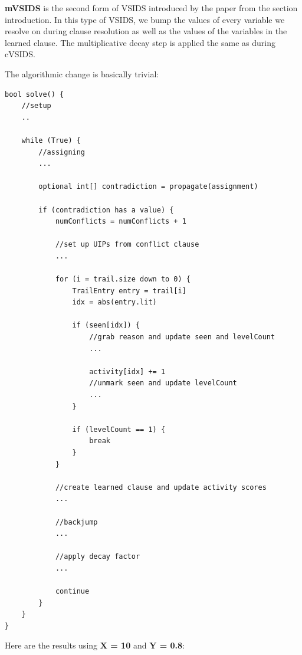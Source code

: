 \documentclass[../main.tex]{subfiles}
\begin{document}
\textbf{mVSIDS} is the second form of VSIDS introduced by the paper from 
the section introduction. In this type of VSIDS, we bump the values of 
every variable we resolve on during clause resolution as well as the values 
of the variables in the learned clause. The multiplicative decay step is 
applied the same as during cVSIDS.

The algorithmic change is basically trivial:
\begin{lstlisting}
bool solve() {
    //setup
    ..

    while (True) {
        //assigning
        ...

        optional int[] contradiction = propagate(assignment)

        if (contradiction has a value) {
            numConflicts = numConflicts + 1

            //set up UIPs from conflict clause
            ...

            for (i = trail.size down to 0) {
                TrailEntry entry = trail[i]
                idx = abs(entry.lit)

                if (seen[idx]) {
                    //grab reason and update seen and levelCount
                    ...

                    activity[idx] += 1
                    //unmark seen and update levelCount
                    ...
                }

                if (levelCount == 1) {
                    break
                }
            }

            //create learned clause and update activity scores
            ...

            //backjump
            ...

            //apply decay factor
            ...

            continue
        }
    }
}
\end{lstlisting}
\noindent 
Here are the results using \textbf{X = 10} and \textbf{Y = 0.8}:
\end{document}
